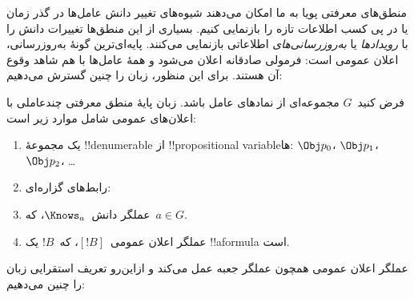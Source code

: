 \documentclass[../../../include/open-logic-section]{subfiles}
\begin{document}


منطق‌های معرفتی پویا به ما امکان می‌دهند شیوه‌های تغییر دانش عامل‌ها
در گذر زمان یا در پی کسب اطلاعات تازه را بازنمایی کنیم. بسیاری از این
منطق‌ها تغییرات دانش را با \emph{رویدادها} یا \emph{به‌روزرسانی‌های}
اطلاعاتی بازنمایی می‌کنند. پایه‌ای‌ترین گونهٔ به‌روزرسانی، اعلان عمومی
است: فرمولی صادقانه اعلان می‌شود و همهٔ عامل‌ها با هم شاهد وقوع آن
هستند. برای این منظور، زبان را چنین گسترش می‌دهیم:

\begin{defn}
فرض کنید~$G$ مجموعه‌ای از نمادهای عامل باشد. زبان پایهٔ منطق معرفتی
چندعاملی با اعلان‌های عمومی شامل موارد زیر است:
\begin{enumerate}
  \item یک مجموعهٔ !!{denumerable} از !!{propositional variable}ها:
    $\Obj p_0$، $\Obj p_1$، $\Obj p_2$، \dots
  \item رابط‌های گزاره‌ای: \startycommalist
  \item عملگر دانش~$\Knows_a$، که~$a \in G$.
  \item عملگر اعلان عمومی~$[!B]$، که~$!B$ یک !!a{formula} است.
\end{enumerate}
\end{defn}

عملگر اعلان عمومی همچون عملگر جعبه عمل می‌کند و ازاین‌رو تعریف استقرایی
زبان را چنین می‌دهیم:
\end{document}
